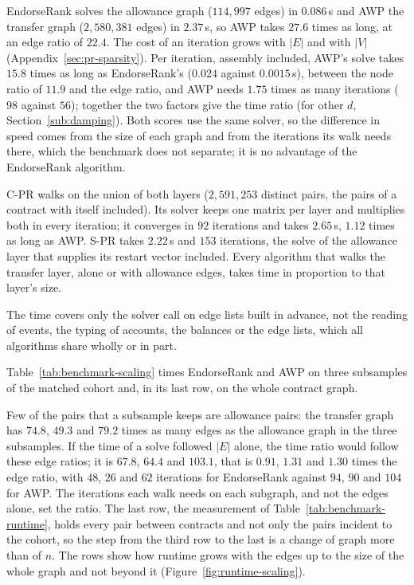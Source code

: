 

EndorseRank solves the allowance graph ($114{,}997$ edges) in $0.086$\,s and AWP the transfer graph ($2{,}580{,}381$ edges) in $2.37$\,s, so AWP takes $27.6$ times as long, at an edge ratio of $22.4$. The cost of an iteration grows with $|E|$ and with $|V|$ (Appendix~\ref{sec:pr-sparsity}). Per iteration, assembly included, AWP's solve takes $15.8$ times as long as EndorseRank's ($0.024$ against $0.0015$\,s), between the node ratio of $11.9$ and the edge ratio, and AWP needs $1.75$ times as many iterations ($98$ against $56$); together the two factors give the time ratio (for other $d$, Section~\ref{sub:damping}). Both scores use the same solver, so the difference in speed comes from the size of each graph and from the iterations its walk needs there, which the benchmark does not separate; it is no advantage of the EndorseRank algorithm.

\mbox{C-PR} walks on the union of both layers ($2{,}591{,}253$ distinct pairs, the pairs of a contract with itself included). Its solver keeps one matrix per layer and multiplies both in every iteration; it converges in $92$ iterations and takes $2.65$\,s, $1.12$ times as long as AWP. \mbox{S-PR} takes $2.22$\,s and $153$ iterations, the solve of the allowance layer that supplies its restart vector included. Every algorithm that walks the transfer layer, alone or with allowance edges, takes time in proportion to that layer's size.

The time covers only the solver call on edge lists built in advance, not the reading of events, the typing of accounts, the balances or the edge lists, which all algorithms share wholly or in part.


Table~\ref{tab:benchmark-scaling} times EndorseRank and AWP on three subsamples of the matched cohort and, in its last row, on the whole contract graph.



Few of the pairs that a subsample keeps are allowance pairs: the transfer graph has $74.8$, $49.3$ and $79.2$ times as many edges as the allowance graph in the three subsamples. If the time of a solve followed $|E|$ alone, the time ratio would follow these edge ratios; it is $67.8$, $64.4$ and $103.1$, that is $0.91$, $1.31$ and $1.30$ times the edge ratio, with $48$, $26$ and $62$ iterations for EndorseRank against $94$, $90$ and $104$ for AWP. The iterations each walk needs on each subgraph, and not the edges alone, set the ratio. The last row, the measurement of Table~\ref{tab:benchmark-runtime}, holds every pair between contracts and not only the pairs incident to the cohort, so the step from the third row to the last is a change of graph more than of $n$. The rows show how runtime grows with the edges up to the size of the whole graph and not beyond it (Figure~\ref{fig:runtime-scaling}).

